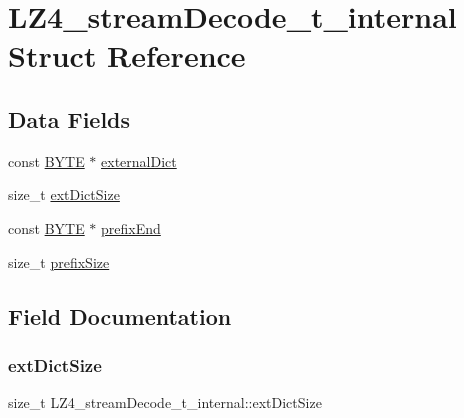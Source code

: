 \hypertarget{struct_l_z4__stream_decode__t__internal}{}\section{L\+Z4\+\_\+stream\+Decode\+\_\+t\+\_\+internal Struct Reference}
\label{struct_l_z4__stream_decode__t__internal}
\subsection*{Data Fields}
\begin{DoxyCompactItemize}
\item 
const \mbox{\hyperlink{lz4_8c_a4ae1dab0fb4b072a66584546209e7d58}{B\+Y\+TE}} $\ast$ \mbox{\hyperlink{struct_l_z4__stream_decode__t__internal_a0edc5a25f4e1e84e48c1a60900dabd4f}{external\+Dict}}
\item 
size\+\_\+t \mbox{\hyperlink{struct_l_z4__stream_decode__t__internal_a6c8e2dcc2579727808da0bfe7a44eaa0}{ext\+Dict\+Size}}
\item 
const \mbox{\hyperlink{lz4_8c_a4ae1dab0fb4b072a66584546209e7d58}{B\+Y\+TE}} $\ast$ \mbox{\hyperlink{struct_l_z4__stream_decode__t__internal_ae54ddf8eaf34cbc8919fb0dea3a5cb60}{prefix\+End}}
\item 
size\+\_\+t \mbox{\hyperlink{struct_l_z4__stream_decode__t__internal_a44f5f7acc14c2bb3865eccd5372107c4}{prefix\+Size}}
\end{DoxyCompactItemize}


\subsection{Field Documentation}
\mbox{\label{struct_l_z4__stream_decode__t__internal_a6c8e2dcc2579727808da0bfe7a44eaa0}} 
\subsubsection{\texorpdfstring{ext\+Dict\+Size}{extDictSize}}
{\footnotesize\ttfamily size\+\_\+t L\+Z4\+\_\+stream\+Decode\+\_\+t\+\_\+internal\+::ext\+Dict\+Size}


